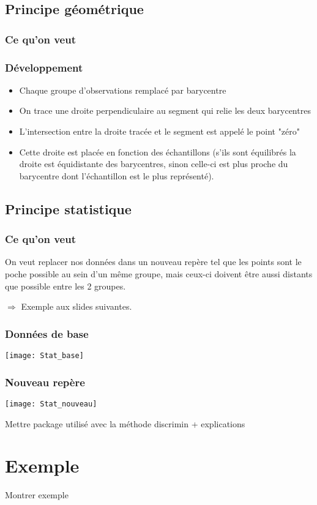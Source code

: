 \documentclass[b]{beamer}
\begin{document}
	\subsection{Principe géométrique}
	\begin{frame}
		\frametitle{Ce qu'on veut}
	\end{frame}
	\begin{frame}
		\frametitle{Développement}
		\begin{itemize}
			\item Chaque groupe d'observations remplacé par barycentre
			\item On trace une droite perpendiculaire au segment qui relie les deux barycentres
			\item L'intersection entre la droite tracée et le segment est appelé le point "zéro"
			\item Cette droite est placée en fonction des échantillons (s'ils sont équilibrés la droite est équidistante des barycentres, sinon celle-ci est plus proche du barycentre dont l'échantillon est le plus représenté).
		\end{itemize}
	\end{frame}

	\subsection{Principe statistique}
	\begin{frame}
		\frametitle{Ce qu'on veut}
		On veut replacer nos données dans un nouveau repère tel que les points sont le poche possible au sein d'un même groupe, mais ceux-ci doivent être aussi distants que possible entre les 2 groupes.
		
		$\Rightarrow$ Exemple aux slides suivantes.
	\end{frame}

	\begin{frame}
		\frametitle{Données de base}
		\texttt{[image: Stat\_base]}
	\end{frame}

	\begin{frame}
	\frametitle{Nouveau repère}
		\texttt{[image: Stat\_nouveau]}
	\end{frame}
	\begin{frame}
		Mettre package utilisé avec la méthode discrimin + explications
	\end{frame}
	\section{Exemple}
	\begin{frame}
		Montrer exemple
	\end{frame}
\end{document}
